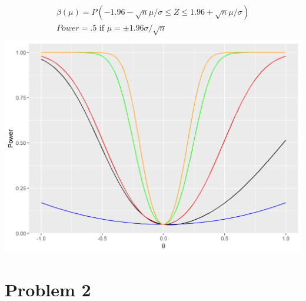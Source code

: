 \documentclass{article}
\newcommand{\B}{\beta}
\newcommand{\sg}{\sigma}
\begin{document}
\begin{flushleft}
\begin{enumerate}[(a)]
\begin{multline*}
\B(\mu)=P(-1.96-\sqrt{n}\mu/\sg\leq Z\leq 1.96+\sqrt{n}\mu /\sg)\\
Power=.5 \text{ if } \mu=\pm 1.96\sg/\sqrt{n}\\
\end{multline*}
\includegraphics[scale=.7]{Rcode/power2.png}
\end{enumerate}

\section*{Problem 2}


\end{flushleft}
\end{document}
